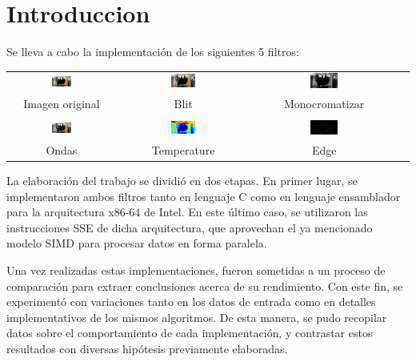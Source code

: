 \section{Introduccion}


Se lleva a cabo la implementación de los siguientes 5 filtros:

\begin{center}
 \begin{tabular}{cccc}
   \includegraphics[width=0.2\textwidth]{imagenes/island.png} &
   \includegraphics[width=0.2\textwidth]{imagenes/island-blit.png} &
   \includegraphics[width=0.2\textwidth]{imagenes/island-monocromatizar.png} \\
   Imagen original & Blit & Monocromatizar \\
   \\
   \includegraphics[width=0.2\textwidth]{imagenes/island-ondas.png} &
   \includegraphics[width=0.2\textwidth]{imagenes/island-temperature.png} &
   \includegraphics[width=0.2\textwidth]{imagenes/island-edge.png} \\
   Ondas & Temperature & Edge \\
 \end{tabular}
\end{center}
  
  La elaboración del trabajo se dividió en dos etapas. En primer lugar, se implementaron ambos filtros tanto en lenguaje C como en lenguaje ensamblador para la arquitectura x86-64 de Intel. En este último caso, se utilizaron las instrucciones SSE de dicha arquitectura, que aprovechan el ya mencionado modelo SIMD para procesar datos en forma paralela.

  Una vez realizadas estas implementaciones, fueron sometidas a un proceso de comparación para extraer conclusiones acerca de su rendimiento. Con este fin, se experimentó con variaciones tanto en los datos de entrada como en detalles implementativos de los mismos algoritmos. De esta manera, se pudo recopilar datos sobre el comportamiento de cada implementación, y contrastar estos resultados con diversas hipótesis previamente elaboradas.

